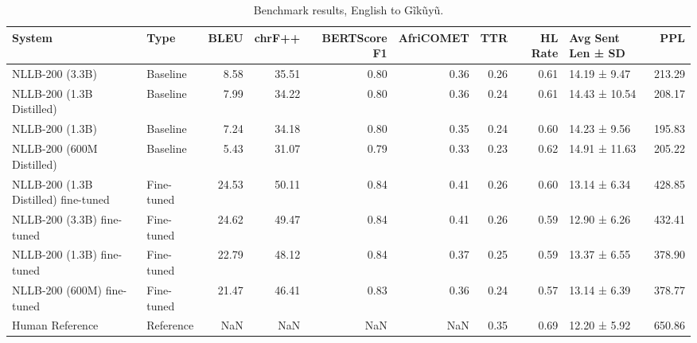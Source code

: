 \begin{table}
\caption{Benchmark results, English to Gĩkũyũ.}
\label{tab:results_eng2kik}
\begin{tabular}{llrrrrrrlr}
\toprule
System & Type & BLEU & chrF++ & BERTScore F1 & AfriCOMET & TTR & HL Rate & Avg Sent Len ± SD & PPL \\
\midrule
NLLB-200 (3.3B) & Baseline & 8.58 & 35.51 & 0.80 & 0.36 & 0.26 & 0.61 & 14.19 ± 9.47 & 213.29 \\
NLLB-200 (1.3B Distilled) & Baseline & 7.99 & 34.22 & 0.80 & 0.36 & 0.24 & 0.61 & 14.43 ± 10.54 & 208.17 \\
NLLB-200 (1.3B) & Baseline & 7.24 & 34.18 & 0.80 & 0.35 & 0.24 & 0.60 & 14.23 ± 9.56 & 195.83 \\
NLLB-200 (600M Distilled) & Baseline & 5.43 & 31.07 & 0.79 & 0.33 & 0.23 & 0.62 & 14.91 ± 11.63 & 205.22 \\
NLLB-200 (1.3B Distilled) fine-tuned & Fine-tuned & 24.53 & 50.11 & 0.84 & 0.41 & 0.26 & 0.60 & 13.14 ± 6.34 & 428.85 \\
NLLB-200 (3.3B) fine-tuned & Fine-tuned & 24.62 & 49.47 & 0.84 & 0.41 & 0.26 & 0.59 & 12.90 ± 6.26 & 432.41 \\
NLLB-200 (1.3B) fine-tuned & Fine-tuned & 22.79 & 48.12 & 0.84 & 0.37 & 0.25 & 0.59 & 13.37 ± 6.55 & 378.90 \\
NLLB-200 (600M) fine-tuned & Fine-tuned & 21.47 & 46.41 & 0.83 & 0.36 & 0.24 & 0.57 & 13.14 ± 6.39 & 378.77 \\
Human Reference & Reference & NaN & NaN & NaN & NaN & 0.35 & 0.69 & 12.20 ± 5.92 & 650.86 \\
\bottomrule
\end{tabular}
\end{table}
